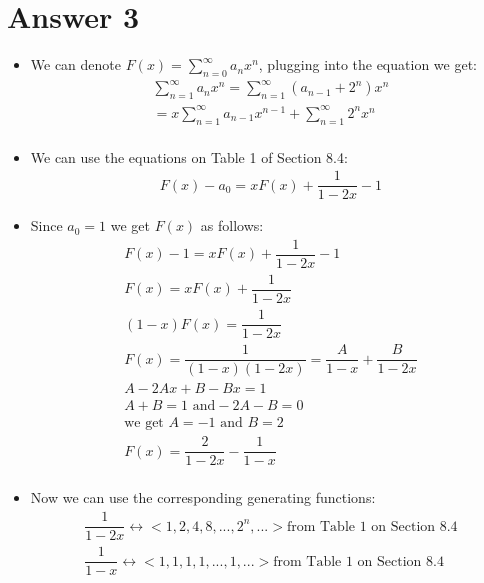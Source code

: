 \documentclass[12pt]{article}
\begin{document}
\section*{Answer 3}
\begin{itemize}
 \item We can denote $F(x) = \sum_{n=0}^{\infty} a_n x^n$, plugging into the equation we get:
 \begin{equation*}
    \begin{split}
        \sum_{n=1}^{\infty} a_n x^n = \sum_{n=1}^{\infty} (a_{n-1} + 2^n) x^n\\
        = x\sum_{n=1}^{\infty} a_{n-1} x^{n-1} + \sum_{n=1}^{\infty} 2^n x^n \\
    \end{split}
 \end{equation*}
 \item We can use the equations on Table 1 of Section 8.4:
 \begin{equation*}
  \begin{aligned}
   F(x) - a_0 = xF(x) + \dfrac{1}{1-2x} - 1
  \end{aligned}
 \end{equation*}
 \item Since $a_0 = 1$ we get $F(x)$ as follows:
 \begin{equation*}
    \begin{split}
        F(x) - 1 = xF(x) + \dfrac{1}{1-2x} - 1 \\
        F(x) = xF(x) + \dfrac{1}{1-2x} \\
        (1-x)F(x) = \dfrac{1}{1-2x} \\
        F(x) = \dfrac{1}{(1-x)(1-2x)} = \dfrac{A}{1-x} + \dfrac{B}{1-2x}\\
        A-2Ax + B - Bx = 1\\
        A+B = 1 \text{ and} -2A-B = 0 \\
        \text{we get } A = -1 \text{ and } B = 2\\
        F(x) = \dfrac{2}{1-2x} - \dfrac{1}{1-x}\\
    \end{split}
 \end{equation*}
 \item Now we can use the corresponding generating functions:
 \begin{equation*}
    \begin{split}
        \dfrac{1}{1-2x}\leftrightarrow <1,2,4,8,...,2^n,...>\text{from Table 1 on Section 8.4}\\
        \dfrac{1}{1-x}\leftrightarrow <1,1,1,1,...,1,...>\text{from Table 1 on Section 8.4}\\

\end{split}
\end{equation*}
\end{itemize}
\end{document}
